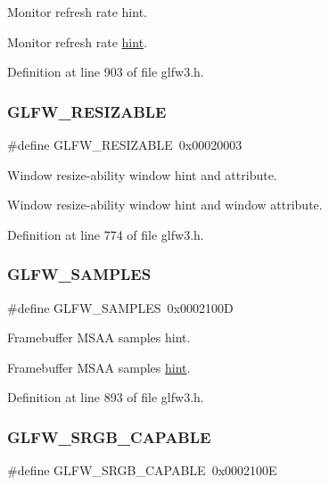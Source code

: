 Monitor refresh rate hint. 

Monitor refresh rate \mbox{\hyperlink{group__window_ga0f20825e6e47ee8ba389024519682212}{hint}}. 

Definition at line 903 of file glfw3.\+h.

\mbox{\label{group__window_gadba13c7a1b3aa40831eb2beedbd5bd1d}} 
\subsubsection{\texorpdfstring{GLFW\_RESIZABLE}{GLFW\_RESIZABLE}}
{\footnotesize\ttfamily \#define G\+L\+F\+W\+\_\+\+R\+E\+S\+I\+Z\+A\+B\+LE~0x00020003}



Window resize-\/ability window hint and attribute. 

Window resize-\/ability window hint and window attribute. 

Definition at line 774 of file glfw3.\+h.

\mbox{\label{group__window_ga2cdf86fdcb7722fb8829c4e201607535}} 
\subsubsection{\texorpdfstring{GLFW\_SAMPLES}{GLFW\_SAMPLES}}
{\footnotesize\ttfamily \#define G\+L\+F\+W\+\_\+\+S\+A\+M\+P\+L\+ES~0x0002100D}



Framebuffer M\+S\+AA samples hint. 

Framebuffer M\+S\+AA samples \mbox{\hyperlink{group__window_ga2cdf86fdcb7722fb8829c4e201607535}{hint}}. 

Definition at line 893 of file glfw3.\+h.

\mbox{\label{group__window_ga444a8f00414a63220591f9fdb7b5642b}} 
\subsubsection{\texorpdfstring{GLFW\_SRGB\_CAPABLE}{GLFW\_SRGB\_CAPABLE}}
{\footnotesize\ttfamily \#define G\+L\+F\+W\+\_\+\+S\+R\+G\+B\+\_\+\+C\+A\+P\+A\+B\+LE~0x0002100E}



